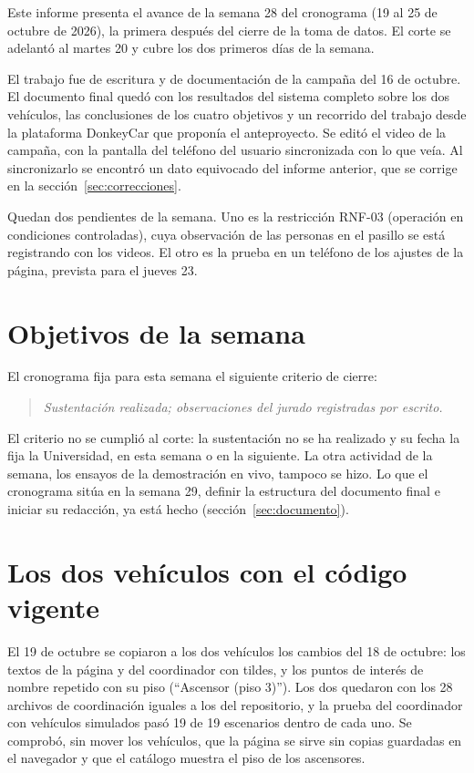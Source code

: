 \documentclass[12pt,letterpaper]{article}
\begin{document}
Este informe presenta el avance de la semana 28 del cronograma (19 al 25 de octubre de 2026), la primera después del cierre de la toma de datos. El corte se adelantó al martes 20 y cubre los dos primeros días de la semana.

El trabajo fue de escritura y de documentación de la campaña del 16 de octubre. El documento final quedó con los resultados del sistema completo sobre los dos vehículos, las conclusiones de los cuatro objetivos y un recorrido del trabajo desde la plataforma DonkeyCar que proponía el anteproyecto. Se editó el video de la campaña, con la pantalla del teléfono del usuario sincronizada con lo que veía. Al sincronizarlo se encontró un dato equivocado del informe anterior, que se corrige en la sección~\ref{sec:correcciones}.

Quedan dos pendientes de la semana. Uno es la restricción RNF-03 (operación en condiciones controladas), cuya observación de las personas en el pasillo se está registrando con los videos. El otro es la prueba en un teléfono de los ajustes de la página, prevista para el jueves 23.

\section{Objetivos de la semana}

El cronograma fija para esta semana el siguiente criterio de cierre:

\begin{quote}
\textit{Sustentación realizada; observaciones del jurado registradas por escrito.}
\end{quote}

El criterio no se cumplió al corte: la sustentación no se ha realizado y su fecha la fija la Universidad, en esta semana o en la siguiente. La otra actividad de la semana, los ensayos de la demostración en vivo, tampoco se hizo. Lo que el cronograma sitúa en la semana 29, definir la estructura del documento final e iniciar su redacción, ya está hecho (sección~\ref{sec:documento}).

\section{Los dos vehículos con el código vigente}

El 19 de octubre se copiaron a los dos vehículos los cambios del 18 de octubre: los textos de la página y del coordinador con tildes, y los puntos de interés de nombre repetido con su piso (``Ascensor (piso 3)''). Los dos quedaron con los 28 archivos de coordinación iguales a los del repositorio, y la prueba del coordinador con vehículos simulados pasó 19 de 19 escenarios dentro de cada uno. Se comprobó, sin mover los vehículos, que la página se sirve sin copias guardadas en el navegador y que el catálogo muestra el piso de los ascensores.
\end{document}
